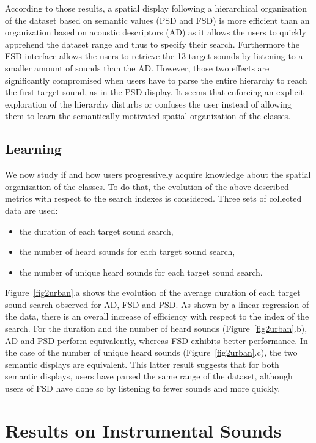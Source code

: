 \documentclass{aes2e}
\begin{document}
According to those results, a spatial display following a hierarchical organization of the dataset based on semantic values (PSD and FSD) is more efficient than an organization based on acoustic descriptors (AD) as it allows the users to quickly apprehend the dataset range and thus to specify their search. Furthermore the FSD interface allows the users to retrieve the 13 target sounds by listening to a smaller amount of sounds than the AD. However, those two effects are significantly compromised when users have to parse the entire hierarchy to reach the first target sound, as in the PSD display. It seems that enforcing an explicit exploration of the hierarchy disturbs or confuses the user instead of allowing them to learn the semantically motivated spatial organization of the classes. 


\subsection{Learning}

We now study if and how users progressively acquire knowledge about the spatial organization of the classes. To do that, the evolution of the above described metrics with respect to the search indexes is considered. Three sets of collected data are used:

\begin{itemize}
\item the duration of each target sound search,
\item the number of heard sounds for each target sound search,
\item the number of unique heard sounds for each target sound search. 
\end{itemize}

Figure~\ref{fig2urban}.a shows the evolution of the average duration of each target sound search observed for AD, FSD and PSD. As shown by a linear regression of the data, there is an overall increase of efficiency with respect to the index of the search. For the duration and the number of heard sounds (Figure~\ref{fig2urban}.b), AD and PSD perform equivalently, whereas FSD exhibits better performance. In the case of the number of unique heard sounds (Figure~\ref{fig2urban}.c), the two semantic displays are equivalent. This latter result suggests that for both semantic displays, users have parsed the same range of the dataset, although users of FSD have done so by listening to fewer sounds and more quickly. 

\section{Results on Instrumental Sounds} \label{resultsm}
\end{document}
